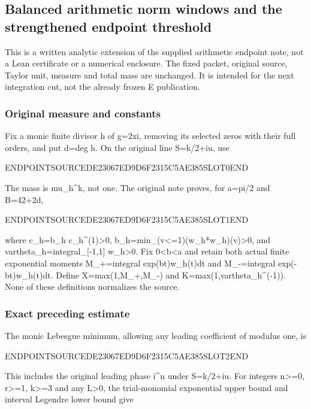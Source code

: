 \subsection{Balanced arithmetic norm windows and the strengthened endpoint threshold}\label{endpoint-balanced_window--balanced-arithmetic-norm-windows-and-the-strengthened-endpoint-threshold}

This is a written analytic extension of the supplied arithmetic endpoint note, not a Lean certificate or a numerical enclosure. The fixed packet, original source, Taylor unit, measure and total mass are unchanged. It is intended for the next integration cut, not the already frozen E publication.

\subsubsection{Original measure and constants}\label{endpoint-balanced_window--original-measure-and-constants}

Fix a monic finite divisor h of g=2xi, removing its selected zeros with their full orders, and put d=deg h. On the original line S=k/2+iu, use

ENDPOINTSOURCEDE23067ED9D6F2315C5AE385SLOT0END

The mass is mu\_h\^{}k, not one. The original note proves, for a=pi/2 and B=42+2d,

ENDPOINTSOURCEDE23067ED9D6F2315C5AE385SLOT1END

where c\_h=b\_h c\_h\^{}(1)\textgreater0, b\_h=min\_(\textbar v\textbar\textless=1)(w\_h*w\_h)(v)\textgreater0, and vartheta\_h=integral\_{[}-1,1{]} w\_h\textgreater0. Fix 0\textless b\textless a and retain both actual finite exponential moments M\_+=integral exp(bt)w\_h(t)dt and M\_-=integral exp(-bt)w\_h(t)dt. Define X=max(1,M\_+,M\_-) and K=max(1,vartheta\_h\^{}(-1)). None of these definitions normalizes the source.

\subsubsection{Exact preceding estimate}\label{endpoint-balanced_window--exact-preceding-estimate}

The monic Lebesgue minimum, allowing any leading coefficient of modulus one, is

ENDPOINTSOURCEDE23067ED9D6F2315C5AE385SLOT2END

This includes the original leading phase i\^{}n under S=k/2+iu. For integers n\textgreater=0, r\textgreater=1, k\textgreater=3 and any L\textgreater0, the trial-monomial exponential upper bound and interval Legendre lower bound give

